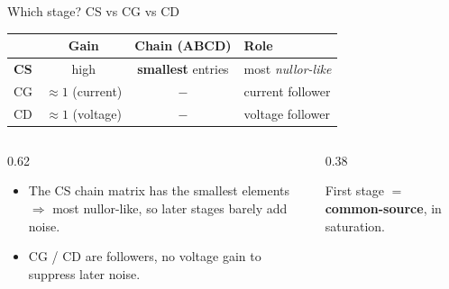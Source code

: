 \documentclass[aspectratio=169,9pt]{beamer}
\begin{document}
\begin{frame}{Which stage? CS vs CG vs CD}
  \centering
  \renewcommand{\arraystretch}{1.15}
  \begin{tabular}{@{}l c c l@{}}
    \toprule
    & \textbf{Gain} & \textbf{Chain (ABCD)} & \textbf{Role} \\ \midrule
    \textbf{CS} & high & \textbf{smallest} entries & most \emph{nullor-like} \\
    CG & $\approx1$ (current) & $-$ & current follower \\
    CD & $\approx1$ (voltage) & $-$ & voltage follower \\
    \bottomrule
  \end{tabular}
  \vfill
  \begin{columns}[T]
    \begin{column}{0.62\textwidth}
      \begin{itemize}
        \item The CS chain matrix has the smallest elements $\Rightarrow$ most nullor-like, so
          later stages barely add noise.
        \item CG / CD are followers, no voltage gain to suppress later noise.
      \end{itemize}
    \end{column}
    \begin{column}{0.38\textwidth}
      \begin{resultbox}First stage $=$ \textbf{common-source}, in saturation.\end{resultbox}
    \end{column}
  \end{columns}
\end{frame}
\end{document}
